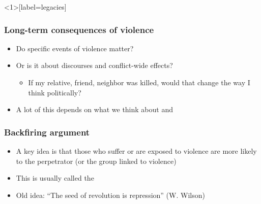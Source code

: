 \documentclass[aspectratio=43]{beamer}
\begin{document}

\begin{frame}<1>[label=legacies]
\frametitle{Long-term consequences of violence}
\centering

\begin{itemize}[<+->]
\item Do specific events of violence matter?
\item Or is it about discourses and conflict-wide effects?
  \begin{itemize}
    \item If my relative, friend, neighbor was killed, would that change the way I think politically?
  \end{itemize}
\item A lot of this depends on what we think about {\color{red}{how wartime violence happens}} and {\color{red}{whether what happens in a war leaves legacies}}
\end{itemize}

\end{frame}

\begin{frame}
\frametitle{Backfiring argument}
\centering

\begin{itemize}
  \item A key idea is that those who suffer or are exposed to violence are more likely to  the perpetrator (or the group linked to violence)
  \item This is usually called the \textbf{{\color{red}{backfiring argument}}}
  \item Old idea: ``The seed of revolution is repression'' (W. Wilson)
\end{itemize}

\end{frame}
\end{document}
